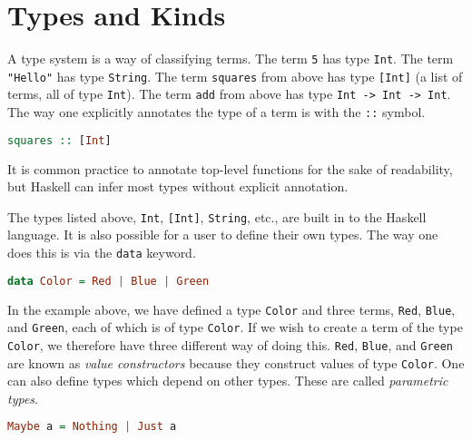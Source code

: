 \documentclass[MS, xcolor=dvipsnames]{wfuthesis}
\theoremstyle{definition}
\begin{document}
\section{Types and Kinds}
A type system is a way of classifying terms. The term \lstinline{5} has type \lstinline{Int}. The term \lstinline{"Hello"} has type \lstinline{String}. The term \lstinline{squares} from above has type \lstinline{[Int]} (a list of terms, all of type \lstinline{Int}). The term \lstinline{add} from above has type \lstinline{Int -> Int -> Int}. The way one explicitly annotates the type of a term is with the \lstinline{::} symbol.
\begin{lstlisting}[language=Haskell]
squares :: [Int]
\end{lstlisting}
It is common practice to annotate top-level functions for the sake of readability, but Haskell can infer most types without explicit annotation. \par
The types listed above, \lstinline{Int}, \lstinline{[Int]}, \lstinline{String}, etc., are built in to the Haskell language. It is also possible for a user to define their own types. The way one does this is via the \lstinline{data} keyword.
\begin{lstlisting}[language=Haskell]
data Color = Red | Blue | Green
\end{lstlisting}
In the example above, we have defined a type \lstinline{Color} and three terms, \lstinline{Red}, \lstinline{Blue}, and \lstinline{Green}, each of which is of type \lstinline{Color}. If we wish to create a term of the type \lstinline{Color}, we therefore have three different way of doing this. \lstinline{Red}, \lstinline{Blue}, and \lstinline{Green} are known as \emph{value constructors} because they construct values of type \lstinline{Color}. One can also define types which depend on other types. These are called \emph{parametric types}.
\begin{lstlisting}[language=Haskell]
Maybe a = Nothing | Just a
\end{lstlisting}
\end{document}
